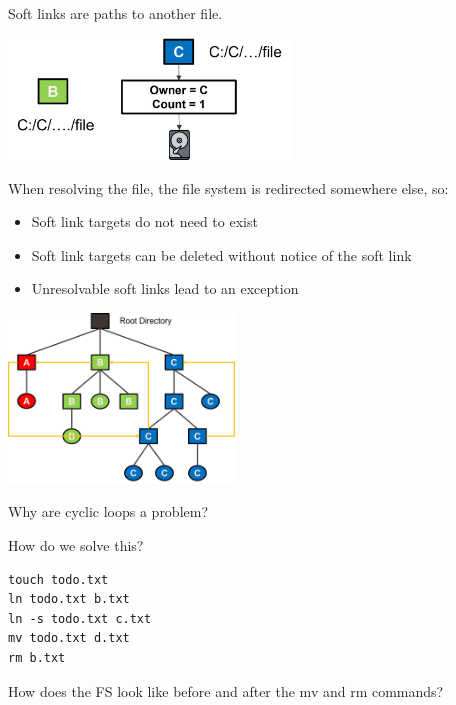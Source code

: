 \begin{slide}


    Soft links are paths to another file.

    \medskip
    \includegraphics[width=75mm]{symbolic-link.png}
    \bigskip

    When resolving the file, the file system is redirected somewhere else, so: 
    \begin{itemize}
        \item Soft link targets do not need to exist 
        \item Soft link targets can be deleted without notice of the soft link 
        \item Unresolvable soft links lead to an exception
    \end{itemize}

\end{slide}

\begin{slide}


    \includegraphics[width=60mm]{cycles-directory-graph.png}
    \bigskip

    Why are cyclic loops a problem?

    How do we solve this?

\end{slide}

\begin{slide}
    

    \begin{verbatim}
touch todo.txt
ln todo.txt b.txt
ln -s todo.txt c.txt
mv todo.txt d.txt
rm b.txt
    \end{verbatim}
    \medskip

    How does the FS look like before and after the mv and rm commands?

\end{slide}

